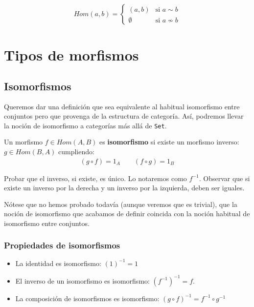 \documentclass[11pt, fleqn, spanish]{book}
\newcommand{\twopartdef}[4]
{
  \left\{
    \begin{array}{ll}
      #1 & \mbox{si } #2 \\
      #3 & \mbox{si } #4
    \end{array}
  \right.
}
\begin{document}
\begin{align*}
  Hom(a,b)= \twopartdef{(a,b)}{a \sim b}{\emptyset}{a \nsim b}
\end{align*}





\chapter{Tipos de morfismos}

\section {Isomorfismos}
Queremos dar una definición que sea equivalente al habitual isomorfismo entre conjuntos
pero que provenga de la estructura de categoría. Así, podremos llevar la noción de
isomorfismo a categorías más allá de \texttt{Set}.

\begin{definition}
  Un morfismo $f \in Hom(A,B)$ es \textbf{isomorfismo} si existe un morfismo inverso:
  $g \in Hom(B,A)$ cumpliendo:
  \begin{gather*}
    (g \circ f) = 1_A \qquad (f \circ g) = 1_B
  \end{gather*}
\end{definition}
  
\begin{exercise} 
  Probar que el inverso, si existe, es único. Lo notaremos como $f^{-1}$. Observar que si
  existe un inverso por la derecha y un inverso por la izquierda, deben ser iguales.
\end{exercise}

Nótese que no hemos probado todavía (aunque veremos que es trivial), que la noción de
isomorfismo que acabamos de definir coincida con la noción habitual de isomorfismo entre
conjuntos.
    
    \subsection{Propiedades de isomorfismos}
      \begin{itemize}
       \item La identidad es isomorfismo: $(1)^{-1} = 1$ 
       \item El inverso de un isomorfismo es isomorfismo: $(f^{-1})^{-1} = f$.
       \item La composición de isomorfismos es isomorfismo: $(g \circ f)^{-1} = f^{-1} \circ g^{-1}$
      \end{itemize}
\end{document}
